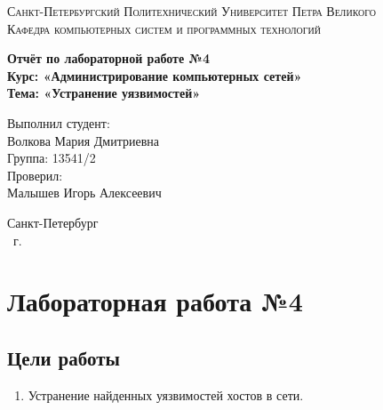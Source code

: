 \documentclass[14pt,a4paper,report]{report}
\begin{document}
\def\contentsname{Содержание}

\begin{titlepage}
	\begin{center}
		\textsc{Санкт-Петербургский Политехнический 
			Университет Петра Великого\\[5mm]
			Кафедра компьютерных систем и программных технологий}
		
		\vfill
		
		\textbf{Отчёт по лабораторной работе №4\\[3mm]
			Курс: «Администрирование компьютерных сетей»\\[3mm]
			Тема: «Устранение уязвимостей»\\[35mm]
			}
	\end{center}
	
	\hfill
	\begin{minipage}{.5\textwidth}
		Выполнил студент:\\[2mm] 
		Волкова Мария Дмитриевна\\
		Группа: 13541/2\\[5mm]
		
		Проверил:\\[2mm] 
		Малышев Игорь Алексеевич
	\end{minipage}
	\vfill
	\begin{center}
		Санкт-Петербург\\ \the\year\ г.
	\end{center}
\end{titlepage}

\tableofcontents
\clearpage

\chapter{Лабораторная работа №4}
\section{Цели работы}
\begin{enumerate}
\item Устранение найденных уязвимостей хостов в сети.
\end{enumerate}
\end{document}
